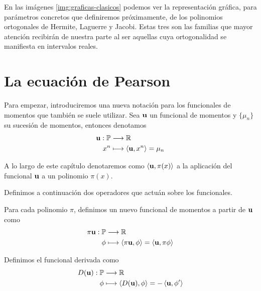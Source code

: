 En las imágenes \ref{img:graficas-clasicos} podemos ver la representación gráfica, para parámetros concretos que definiremos próximamente, de los polinomios ortogonales de Hermite, Laguerre y Jacobi. Estas tres son las familias que mayor atención recibirán de nuestra parte al ser aquellas cuya ortogonalidad se manifiesta en intervalos reales.

\section{La ecuación de Pearson}

Para empezar, introduciremos una nueva notación para los funcionales de momentos que también se suele utilizar. Sea $\mathbf{u}$ un funcional de momentos y $\{\mu_n\}$ su sucesión de momentos, entonces denotamos
\begin{equation}
    \label{eq:nueva-notacion-funcional}
    \begin{split}
        \mathbf{u}:\mathbb P & \longrightarrow \mathbb{R} \\
        x^n & \longmapsto \left\langle \mathbf{u}, x^n \right\rangle = \mu_n
    \end{split}
\end{equation}

A lo largo de este capítulo denotaremos como $\left\langle \mathbf{u} , \pi(x) \right\rangle$ a la aplicación del funcional $\mathbf{u}$ a un polinomio $\pi(x)$.

Definimos a continuación dos operadores que actuán sobre los funcionales.

\begin{definicion}
    Para cada polinomio $\pi$, definimos un nuevo funcional de momentos a partir de $\mathbf{u}$ como
    \begin{equation}
        \begin{split}
            \pi\mathbf{u}:\mathbb P & \longrightarrow \mathbb{R} \\
            \phi & \longmapsto \left\langle \pi\mathbf{u} , \phi \right\rangle=\left\langle \mathbf{u} , \pi\phi \right\rangle
        \end{split}
    \end{equation}
    
\end{definicion}

\begin{definicion}[Derivada]
    Definimos el funcional derivada como
    \begin{equation}
        \begin{split}
            D(\mathbf{u}):\mathbb P & \longrightarrow \mathbb{R} \\
            \phi & \longmapsto \left\langle D(\mathbf{u}) , \phi \right\rangle=-\left\langle \mathbf{u} , \phi' \right\rangle
        \end{split}
    \end{equation}
    
\end{definicion}

